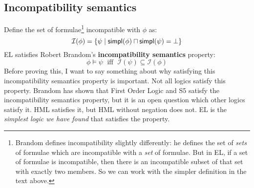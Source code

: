 \subsection{Incompatibility semantics}\label{incompatibility}

\NI Define the set of formulae\footnote{Brandom \cite{brandom} defines
  incompatibility slightly differently: he defines the set of
  \emph{sets} of formulae which are incompatible with a \emph{set} of
  formulae.  But in EL, if a set of formulae is incompatible, then
  there is an incompatible subset of that set with exactly two
  members.  So we can work with the simpler definition in the text
  above.}  incompatible with $\phi$ as:
\[
\mathcal{I}(\phi) = \{ \psi \; | \; \mathsf{simpl}(\phi) \sqcap \mathsf{simpl}(\psi) = \bot \}
\]
EL satisfies Robert Brandom's \textbf{incompatibility semantics}  property:
\[
\phi \models \psi \; \mbox{ iff } \; \mathcal{I}(\psi) \subseteq \mathcal{I}(\phi)
\]
Before proving this, I want to say something about why satisfying this incompatibility semantics property is important.
Not all logics satisfy this property. 
Brandom has shown that First Order Logic and S5 satisfy the incompatibility semantics property, but it is an open question which other logics satisfy it.
HML satisfies it, but HML without negation does not.
EL is the \emph{simplest logic we have found} that satisfies the property.

